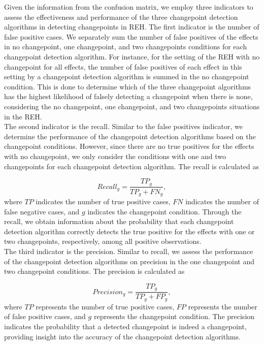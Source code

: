 \documentclass[]{interact}
\theoremstyle{plain}%
\theoremstyle{definition}
\theoremstyle{remark}
\begin{document}
	Given the information from the confusion matrix, we employ three indicators to assess the effectiveness and performance of the three changepoint detection algorithms in detecting changepoints in REH. The first indicator is the number of false positive cases. We separately sum the number of false positives of the effects in no changepoint, one changepoint, and two changepoints conditions for each changepoint detection algorithm. For instance, for the setting of the REH with no changepoint for all effects, the number of false positives of each effect in this setting by a changepoint detection algorithm is summed in the no changepoint condition. This is done to determine which of the three changepoint algorithms has the highest likelihood of falsely detecting a changepoint when there is none, considering the no changepoint, one changepoint, and two changepoints situations in the REH. \\
	
	The second indicator is the recall. Similar to the false positives indicator, we determine the performance of the changepoint detection algorithms based on the changepoint conditions. However, since there are no true positives for the effects with no changepoint, we only consider the conditions with one and two changepoints for each changepoint detection algorithm. The recall is calculated as
	
	\begin{equation} \label{7}
		Recall_g = \frac{TP_g}{TP_g + FN_g},
	\end{equation}
    where $TP$ indicates the number of true positive cases, $FN$ indicates the number of false negative cases, and $g$ indicates the changepoint condition. Through the recall, we obtain information about the probability that each changepoint detection algorithm correctly detects the true positive for the effects with one or two changepoints, respectively, among all positive observations. \\

    The third indicator is the precision. Similar to recall, we assess the performance of the changepoint detection algorithms on precision in the one changepoint and two changepoint conditions. The precision is calculated as
 
    \begin{equation} \label{8}
    	Precision_g = \frac{TP_g}{TP_g + FP_g},
    \end{equation}
	where $TP$ represents the number of true positive cases, $FP$ represents the number of false positive cases, and $g$ represents the changepoint condition. The precision indicates the probability that a detected changepoint is indeed a changepoint, providing insight into the accuracy of the changepoint detection algorithms.
	
\end{document}
